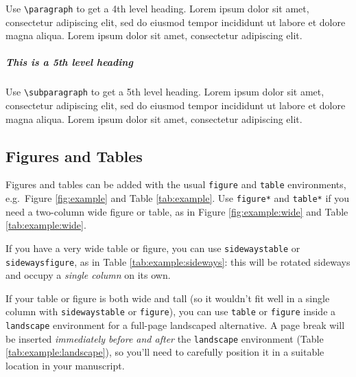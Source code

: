 \documentclass[a4paper,num-refs]{oup-contemporary}
\begin{document}
Use \verb|\paragraph| to get a 4th level heading.
Lorem ipsum dolor sit amet, consectetur adipiscing elit, sed do eiusmod tempor incididunt ut labore et dolore magna aliqua. Lorem ipsum dolor sit amet, consectetur adipiscing elit. 

\subparagraph{This is a 5th level heading}

Use \verb|\subparagraph| to get a 5th level heading.
Lorem ipsum dolor sit amet, consectetur adipiscing elit, sed do eiusmod tempor incididunt ut labore et dolore magna aliqua. Lorem ipsum dolor sit amet, consectetur adipiscing elit.


\subsection{Figures and Tables}
Figures and tables can be added with the usual \verb|figure| and \verb|table| environments, e.g.~Figure \ref{fig:example} and Table \ref{tab:example}. Use \verb|figure*| and \verb|table*| if you need a two-column wide figure or table, as in Figure \ref{fig:example:wide} and Table \ref{tab:example:wide}. 

If you have a very wide table or figure, you can use \texttt{sidewaystable} or \texttt{sidewaysfigure}, as in Table \ref{tab:example:sideways}: this will be rotated sideways and occupy a \emph{single column} on its own.

If your table or figure is both wide and tall (so it wouldn't fit well in a single column with \texttt{sidewaystable} or \texttt{figure}), 
you can use \verb|table| or \verb|figure| inside a \verb|landscape| environment for a full-page landscaped alternative. A page break will be inserted \emph{immediately before and after} the \verb|landscape| environment (Table \ref{tab:example:landscape}), so you'll need to carefully position it in a suitable location in your manuscript.


\end{document}
